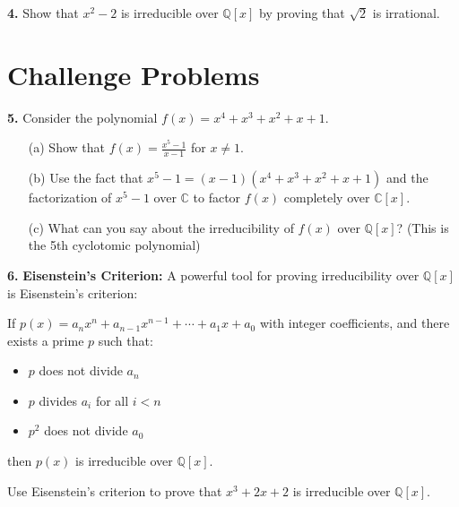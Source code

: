\documentclass[12pt]{article}
\begin{document}
\textbf{4.} Show that $x^2 - 2$ is irreducible over $\mathbb{Q}[x]$ by proving that $\sqrt{2}$ is irrational.
\vspace{4cm}

\newpage

\section{Challenge Problems}

\textbf{5.} Consider the polynomial $f(x) = x^4 + x^3 + x^2 + x + 1$.

\begin{enumerate}
\item[(a)] Show that $f(x) = \frac{x^5 - 1}{x - 1}$ for $x \neq 1$.
\vspace{2cm}

\item[(b)] Use the fact that $x^5 - 1 = (x-1)(x^4 + x^3 + x^2 + x + 1)$ and the factorization of $x^5 - 1$ over $\mathbb{C}$ to factor $f(x)$ completely over $\mathbb{C}[x]$.
\vspace{3cm}

\item[(c)] What can you say about the irreducibility of $f(x)$ over $\mathbb{Q}[x]$? (This is the 5th cyclotomic polynomial)
\vspace{2cm}
\end{enumerate}

\newpage

\textbf{6.} \textbf{Eisenstein's Criterion:} A powerful tool for proving irreducibility over $\mathbb{Q}[x]$ is Eisenstein's criterion:

If $p(x) = a_n x^n + a_{n-1} x^{n-1} + \cdots + a_1 x + a_0$ with integer coefficients, and there exists a prime $p$ such that:
\begin{itemize}
\item $p$ does not divide $a_n$
\item $p$ divides $a_i$ for all $i < n$  
\item $p^2$ does not divide $a_0$
\end{itemize}
then $p(x)$ is irreducible over $\mathbb{Q}[x]$.

Use Eisenstein's criterion to prove that $x^3 + 2x + 2$ is irreducible over $\mathbb{Q}[x]$.
\vspace{3cm}
\end{document}
